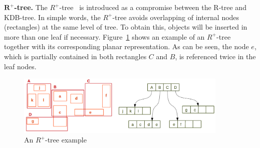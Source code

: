 \documentclass[a4paper,12pt]{article}
\begin{document}
\textbf{$\boldsymbol{R^+}$-tree.}
The $R^+$-tree~\cite{Sellis:rplustree} is introduced as a compromise between the R-tree and KDB-tree. In simple words, the $R^+$-tree avoids overlapping of internal nodes (rectangles) at the same level of tree. To obtain this, objects will be inserted in more than one leaf if necessary. Figure~\ref{r+tree} shows an example of an $R^+$-tree together with its corresponding planar representation. As can be seen, the node $e$, which is partially contained in both rectangles $C$ and $B$, is referenced twice in the leaf nodes.


\begin{figure}
\centering
\includegraphics[width=0.9\textwidth]{r+tree}
\caption{An {$R^+$-tree} example}
\label{r+tree}
\end{figure}
\end{document}
